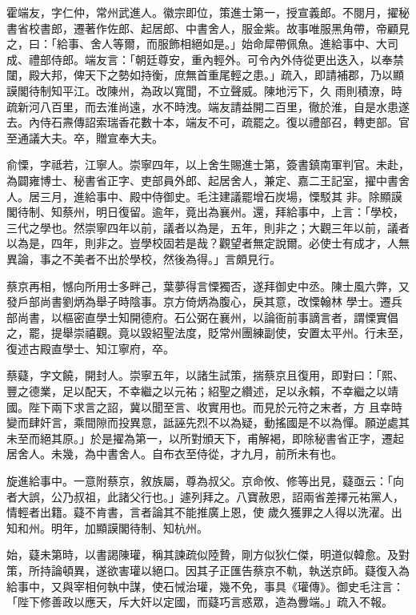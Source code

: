 \begin{pinyinscope}
 霍端友，字仁仲，常州武進人。徽宗即位，策進士第一，授宣義郎。不閱月，擢秘書省校書郎，遷著作佐郎、起居郎、中書舍人，服金紫。故事唯服黑角帶，帝顧見之，曰：「給事、舍人等爾，而服飾相絕如是。」始命犀帶佩魚。進給事中、大司成、禮部侍郎。端友言：「朝廷尊安，重內輕外。可令內外侍從更出迭入，以奉禁闥，殿大邦，俾天下之勢如持衡，庶無首重尾輕之患。」疏入，即請補郡，乃以顯謨閣待制知平江。改陳州，為政以寬聞，不立聲威。陳地污下，久
 雨則積潦，時疏新河八百里，而去淮尚遠，水不時洩。端友請益開二百里，徹於淮，自是水患遂去。內侍石燾傳詔索瑞香花數十本，端友不可，疏罷之。復以禮部召，轉吏部。官至通議大夫。卒，贈宣奉大夫。



 俞慄，字祗若，江寧人。崇寧四年，以上舍生賜進士第，簽書鎮南軍判官。未赴，為闢雍博士、秘書省正字、吏部員外郎、起居舍人，兼定、嘉二王記室，擢中書舍人。居三月，進給事中、殿中侍御史。毛注建議罷增石炭場，慄駁其
 非。除顯謨閣待制、知蔡州，明日復留。逾年，竟出為襄州。還，拜給事中，上言：「學校，三代之學也。然崇寧四年以前，議者以為是，五年，則非之；大觀三年以前，議者以為是，四年，則非之。豈學校固若是哉？觀望者無定說爾。必使士有成才，人無異論，事之不美者不出於學校，然後為得。」言頗見行。



 蔡京再相，憾向所用士多畔己，葉夢得言慄獨否，遂拜御史中丞。陳士風六弊，又發戶部尚書劉炳為舉子時陰事。京方倚炳為腹心，戾其意，改慄翰林
 學士。遷兵部尚書，以樞密直學士知開德府。石公弼在襄州，以論衙前事謫言者，謂慄實倡之，罷，提舉崇禧觀。竟以毀紹聖法度，貶常州團練副使，安置太平州。行未至，復述古殿直學士、知江寧府，卒。



 蔡薿，字文饒，開封人。崇寧五年，以諸生試策，揣蔡京且復用，即對曰：「熙、豐之德業，足以配天，不幸繼之以元祐；紹聖之纘述，足以永賴，不幸繼之以靖國。陛下兩下求言之詔，冀以聞至言、收實用也。而見於元符之末者，方
 且幸時變而肆奸言，乘間隙而投異意，詆誣先烈不以為疑，動搖國是不以為憚。願逆處其未至而絕其原。」於是擢為第一，以所對頒天下，甫解褐，即除秘書省正字，遷起居舍人。未幾，為中書舍人。自布衣至侍從，才九月，前所未有也。



 旋進給事中。一意附蔡京，敘族屬，尊為叔父。京命攸、修等出見，薿亟云：「向者大誤，公乃叔祖，此諸父行也。」遽列拜之。八寶赦恩，詔兩省差擇元祐黨人，情輕者出籍。薿不肯書，言者論其不能推廣上恩，使
 歲久獲罪之人得以洗濯。出知和州。明年，加顯謨閣待制、知杭州。



 始，薿未第時，以書謁陳瓘，稱其諫疏似陸贄，剛方似狄仁傑，明道似韓愈。及對策，所持論頓異，遂欲害瓘以絕口。因其子正匯告蔡京不軌，執送京師。薿復入為給事中，又與宰相何執中謀，使石悈治瓘，幾不免，事具《瓘傳》。御史毛注言：「陛下修善政以應天，斥大奸以定國，而薿巧言惑眾，造為釁端。」疏入不報。




\end{pinyinscope}
